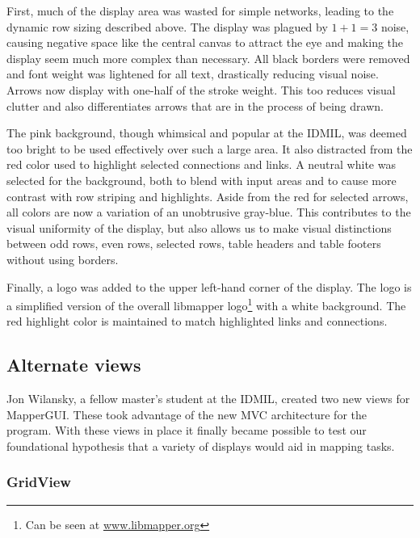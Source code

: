 First, much of the display area was wasted for simple networks, leading to the dynamic row sizing described above. The display was plagued by $1 + 1 = 3$ noise, causing negative space like the central canvas to attract the eye and making the display seem much more complex than necessary. All black borders were removed and font weight was lightened for all text, drastically reducing visual noise. Arrows now display with one-half of the stroke weight. This too reduces visual clutter and also differentiates arrows that are in the process of being drawn.

The pink background, though whimsical and popular at the IDMIL, was deemed too bright to be used effectively over such a large area. It also distracted from the red color used to highlight selected connections and links. A neutral white was selected for the background, both to blend with input areas and to cause more contrast with row striping and highlights. Aside from the red for selected arrows, all colors are now a variation of an unobtrusive gray-blue. This contributes to the visual uniformity of the display, but also allows us to make visual distinctions between odd rows, even rows, selected rows, table headers and table footers without using borders.

Finally, a logo was added to the upper left-hand corner of the display. The logo is a simplified version of the overall libmapper logo\footnote{Can be seen at \url{www.libmapper.org}} with a white background. The red highlight color is maintained to match highlighted links and connections.


	\subsection{Alternate views} %
	\label{sec:alternate_views}

Jon Wilansky, a fellow master's student at the IDMIL, created two new views for MapperGUI. These took advantage of the new MVC architecture for the program. With these views in place it finally became possible to test our foundational hypothesis that a variety of displays would aid in mapping tasks.

		\subsubsection{GridView}

